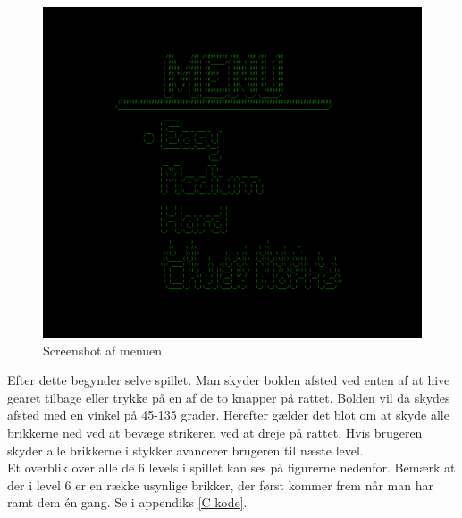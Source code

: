 \begin{figure}[h!]
\centering
\includegraphics[scale=0.25]{figs/screenshots/menu_crop.png}
\caption{Screenshot af menuen}
\label{fig:menu_2}
\end{figure}

Efter dette begynder selve spillet. Man skyder bolden afsted ved enten af at hive gearet tilbage eller trykke på en af de to knapper på rattet. Bolden vil da skydes afsted med en vinkel på 45-135 grader. Herefter gælder det blot om at skyde alle brikkerne ned ved at bevæge strikeren ved at dreje på rattet. Hvis brugeren skyder alle brikkerne i stykker avancerer brugeren til næste level. \\

Et overblik over alle de 6 levels i spillet kan ses på figurerne nedenfor. Bemærk at der i level 6 er en række usynlige brikker, der først kommer frem når man har ramt dem én gang. Se  i appendiks \ref{C kode}. \\

